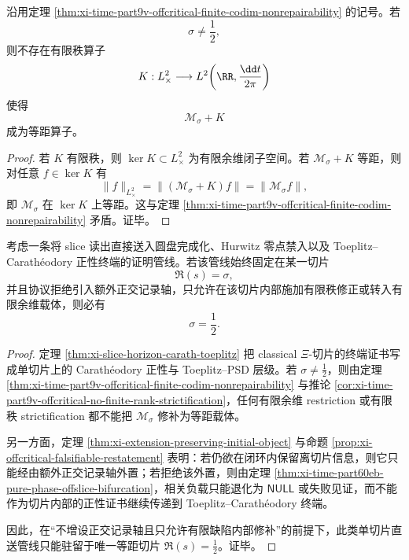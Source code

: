 \begin{corollary}\label{cor:xi-time-part9v-offcritical-no-finite-rank-strictification}
沿用定理 \ref{thm:xi-time-part9v-offcritical-finite-codim-nonrepairability} 的记号。若
\[
\sigma\neq\frac12,
\]
则不存在有限秩算子
\[
K:L^2_\times\longrightarrow L^2\!\left(\RR,\frac{\dd t}{2\pi}\right)
\]
使得
\[
\mathcal M_\sigma+K
\]
成为等距算子。
\end{corollary}
\begin{proof}
若 \(K\) 有限秩，则 \(\ker K\subset L^2_\times\) 为有限余维闭子空间。若 \(\mathcal M_\sigma+K\) 等距，则对任意 \(f\in\ker K\) 有
\[
\|f\|_{L^2_\times}
=
\|(\mathcal M_\sigma+K)f\|
=
\|\mathcal M_\sigma f\|,
\]
即 \(\mathcal M_\sigma\) 在 \(\ker K\) 上等距。这与定理 \ref{thm:xi-time-part9v-offcritical-finite-codim-nonrepairability} 矛盾。证毕。
\end{proof}

\begin{theorem}\label{thm:xi-time-part9v-hurwitz-carath-critical-slice-rigidity}
考虑一条将 slice 读出直接送入圆盘完成化、Hurwitz 零点禁入以及 Toeplitz--Carath\'eodory 正性终端的证明管线。若该管线始终固定在某一切片
\[
\Re(s)=\sigma,
\]
并且协议拒绝引入额外正交记录轴，只允许在该切片内部施加有限秩修正或转入有限余维载体，则必有
\[
\sigma=\frac12.
\]
\end{theorem}
\begin{proof}
定理 \ref{thm:xi-slice-horizon-carath-toeplitz} 把 classical \(\Xi\)-切片的终端证书写成单切片上的 Carath\'eodory 正性与 Toeplitz--PSD 层级。若 \(\sigma\neq\tfrac12\)，则由定理 \ref{thm:xi-time-part9v-offcritical-finite-codim-nonrepairability} 与推论 \ref{cor:xi-time-part9v-offcritical-no-finite-rank-strictification}，任何有限余维 restriction 或有限秩 strictification 都不能把 \(\mathcal M_\sigma\) 修补为等距载体。

另一方面，定理 \ref{thm:xi-extension-preserving-initial-object} 与命题 \ref{prop:xi-offcritical-falsifiable-restatement} 表明：若仍欲在闭环内保留离切片信息，则它只能经由额外正交记录轴外置；若拒绝该外置，则由定理 \ref{thm:xi-time-part60eb-pure-phase-offslice-bifurcation}，相关负载只能退化为 \(\mathsf{NULL}\) 或失败见证，而不能作为切片内部的正性证书继续传递到 Toeplitz--Carath\'eodory 终端。

因此，在“不增设正交记录轴且只允许有限缺陷内部修补”的前提下，此类单切片直送管线只能驻留于唯一等距切片 \(\Re(s)=\tfrac12\)。证毕。
\end{proof}

